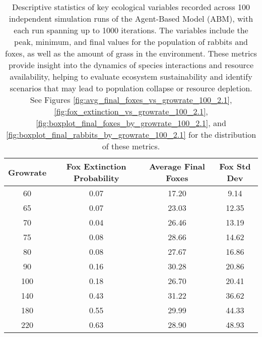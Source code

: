 \begin{table}[h!]
    \centering
    \begin{tabular}{|c|c|c|c|}
    \hline
    \textbf{Growrate} & \textbf{Fox Extinction Probability} & \textbf{Average Final Foxes} & \textbf{Fox Std Dev} \\
    \hline
    60 & 0.07 & 17.20 & 9.14 \\
    65 & 0.07 & 23.03 & 12.35 \\
    70 & 0.04 & 26.46 & 13.19 \\
    75 & 0.08 & 28.66 & 14.62 \\
    80 & 0.08 & 27.67 & 16.86 \\
    90 & 0.16 & 30.28 & 20.86 \\
    100 & 0.18 & 26.70 & 20.41 \\
    140 & 0.43 & 31.22 & 36.62 \\
    180 & 0.55 & 29.99 & 44.33 \\
    220 & 0.63 & 28.90 & 48.93 \\
    \hline
    \end{tabular}
    \caption{
        Descriptive statistics of key ecological variables recorded across 100 independent simulation runs of the 
        Agent-Based Model (ABM), with each run spanning up to 1000 iterations. The variables include the peak, minimum, 
        and final values for the population of rabbits and foxes, as well as the amount of grass in the environment. 
        These metrics provide insight into the dynamics of species 
        interactions and resource availability, helping to evaluate ecosystem 
        sustainability and identify scenarios that may lead to population collapse or resource depletion. 
        See Figures \ref{fig:avg_final_foxes_vs_growrate_100_2.1}, \ref{fig:fox_extinction_vs_growrate_100_2.1},
         \ref{fig:boxplot_final_foxes_by_growrate_100_2.1}, and \ref{fig:boxplot_final_rabbits_by_growrate_100_2.1} for the distribution of these metrics.
    }
    \label{tab:simulation_stats_2.1}
\end{table}

